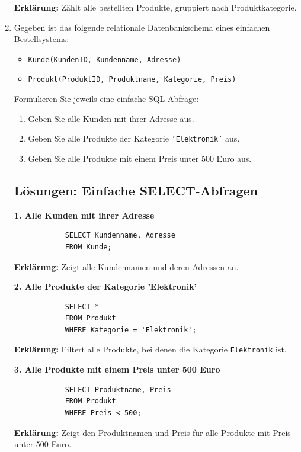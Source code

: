 \documentclass[a4paper,12pt]{article}
\begin{document}
\begin{enumerate}
		\textbf{Erklärung:}  
		Zählt alle bestellten Produkte, gruppiert nach Produktkategorie.
		
		
		\item Gegeben ist das folgende relationale Datenbankschema eines einfachen Bestellsystems:
		
		\begin{itemize}
			\item \texttt{Kunde(KundenID, Kundenname, Adresse)}
			\item \texttt{Produkt(ProduktID, Produktname, Kategorie, Preis)}
		\end{itemize}
		
		Formulieren Sie jeweils eine einfache SQL-Abfrage:
		
		\begin{enumerate}
			\item Geben Sie alle Kunden mit ihrer Adresse aus.
			
			\item Geben Sie alle Produkte der Kategorie \texttt{'Elektronik'} aus.
			
			\item Geben Sie alle Produkte mit einem Preis unter 500 Euro aus.
		\end{enumerate}
		
		\subsection*{Lösungen: Einfache SELECT-Abfragen}
		
		\textbf{1. Alle Kunden mit ihrer Adresse}
		
		\begin{verbatim}
			SELECT Kundenname, Adresse
			FROM Kunde;
		\end{verbatim}
		
		\textbf{Erklärung:}  
		Zeigt alle Kundennamen und deren Adressen an.
		
		\vspace{1em}
		
		\textbf{2. Alle Produkte der Kategorie 'Elektronik'}
		
		\begin{verbatim}
			SELECT *
			FROM Produkt
			WHERE Kategorie = 'Elektronik';
		\end{verbatim}
		
		\textbf{Erklärung:}  
		Filtert alle Produkte, bei denen die Kategorie \texttt{Elektronik} ist.
		
		\vspace{1em}
		
		\textbf{3. Alle Produkte mit einem Preis unter 500 Euro}
		
		\begin{verbatim}
			SELECT Produktname, Preis
			FROM Produkt
			WHERE Preis < 500;
		\end{verbatim}
		
		\textbf{Erklärung:}  
		Zeigt den Produktnamen und Preis für alle Produkte mit Preis unter 500 Euro.
		
		
		\end{enumerate}
		


	
\end{document}
